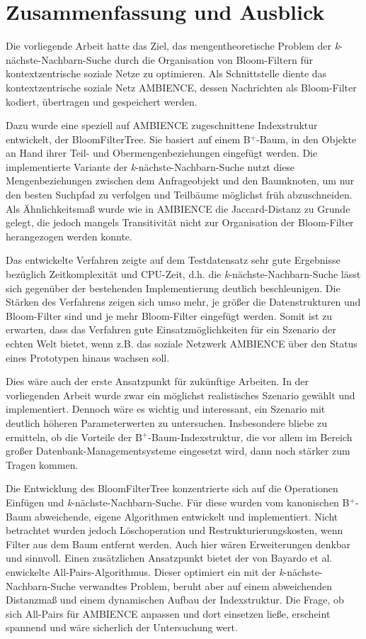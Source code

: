 \chapter{Zusammenfassung und Ausblick}\label{ch:zusammenfassung}
Die vorliegende Arbeit hatte das Ziel, das mengentheoretische Problem der \textit{k}-nächste-Nachbarn-Suche durch die Organisation von Bloom-Filtern für kontextzentrische soziale Netze zu optimieren. Als Schnittstelle diente das kontextzentrische soziale Netz AMBIENCE, dessen Nachrichten als Bloom-Filter kodiert, übertragen und gespeichert werden. 

Dazu wurde eine speziell auf AMBIENCE zugeschnittene Indexstruktur entwickelt, der BloomFilterTree. Sie basiert auf einem B$^+$-Baum, in den Objekte an Hand ihrer Teil- und Obermengenbeziehungen eingefügt werden. Die implementierte Variante der \textit{k}-nächste-Nachbarn-Suche nutzt diese Mengenbeziehungen zwischen dem Anfrageobjekt und den Baumknoten, um nur den besten Suchpfad zu verfolgen und Teilbäume möglichst früh abzuschneiden. Als Ähnlichkeitsmaß wurde wie in AMBIENCE die Jaccard-Distanz zu Grunde gelegt, die jedoch mangels Transitivität nicht zur Organisation der Bloom-Filter herangezogen werden konnte. 

Das entwickelte Verfahren zeigte auf dem Testdatensatz sehr gute Ergebnisse bezüglich Zeitkomplexität und CPU-Zeit, d.h. die \textit{k}-nächste-Nachbarn-Suche lässt sich gegenüber der bestehenden Implementierung deutlich beschleunigen. Die Stärken des Verfahrens zeigen sich umso mehr, je größer die Datenstrukturen und Bloom-Filter sind und je mehr Bloom-Filter eingefügt werden. Somit ist zu erwarten, dass das Verfahren gute Einsatzmöglichkeiten für ein Szenario der echten Welt bietet, wenn z.B. das soziale Netzwerk AMBIENCE über den Status eines Prototypen hinaus wachsen soll. 

Dies wäre auch der erste Ansatzpunkt für zukünftige Arbeiten. In der vorliegenden Arbeit wurde zwar ein möglichst realistisches Szenario gewählt und implementiert. Dennoch wäre es wichtig und interessant, ein Szenario mit deutlich höheren Parameterwerten zu untersuchen. Insbesondere bliebe zu ermitteln, ob die Vorteile der B$^+$-Baum-Indexstruktur, die vor allem im Bereich großer Datenbank-Managementsysteme eingesetzt wird, dann noch stärker zum Tragen kommen. 

Die Entwicklung des BloomFilterTree konzentrierte sich auf die Operationen Einfügen und \textit{k}-nächste-Nachbarn-Suche. Für diese wurden vom kanonischen B$^+$-Baum abweichende, eigene Algorithmen entwickelt und implementiert. Nicht betrachtet wurden jedoch Löschoperation und Restrukturierungskosten, wenn Filter aus dem Baum entfernt werden. Auch hier wären Erweiterungen denkbar und sinnvoll. Einen zusätzlichen Ansatzpunkt bietet der von Bayardo et al. enwickelte All-Pairs-Algorithmus. Dieser optimiert ein mit der \textit{k}-nächste-Nachbarn-Suche verwandtes Problem, beruht aber auf einem abweichenden Distanzmaß und einem dynamischen Aufbau der Indexstruktur. Die Frage, ob sich All-Pairs für AMBIENCE anpassen und dort einsetzen ließe, erscheint spannend und wäre sicherlich der Untersuchung wert. 